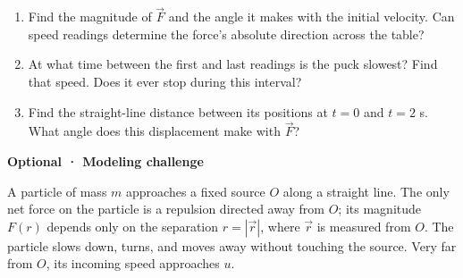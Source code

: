 \documentclass[11pt,a4paper]{article}
\begin{document}
\begin{center}
\end{center}

\begin{enumerate}[label=\alph*)]
  \item Find the magnitude of $\vec F$ and the angle it makes with the
    initial velocity. Can speed readings determine the force's absolute
    direction across the table?
  \item At what time between the first and last readings is the puck
    slowest? Find that speed. Does it ever stop during this interval?
  \item Find the straight-line distance between its positions at $t=0$
    and $t=2$ s. What angle does this displacement make with $\vec F$?
\end{enumerate}


\clearpage
{}
{\color{VectorCoral}\bfseries Optional · Modeling challenge}

A particle of mass $m$ approaches a fixed source $O$ along a straight line.
The only net force on the particle is a repulsion directed away from $O$;
its magnitude $F(r)$ depends only on the separation
$r=|\vec r|$, where $\vec r$ is measured from $O$.
The particle slows down, turns, and moves away without touching the source.
Very far from $O$, its incoming speed approaches $u$.

\begin{center}
\end{center}
\end{document}
